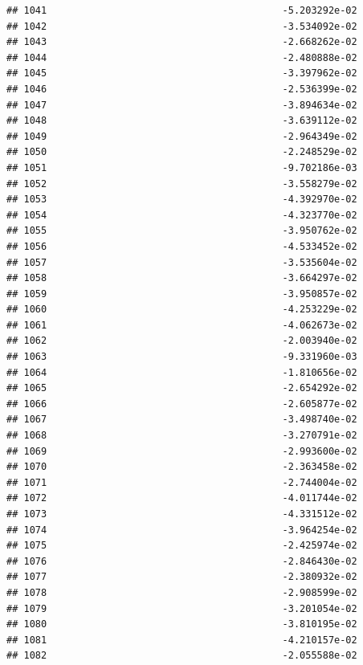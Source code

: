 \documentclass[
]{article}
\begin{document}
\begin{verbatim}
## 1041                                         -5.203292e-02
## 1042                                         -3.534092e-02
## 1043                                         -2.668262e-02
## 1044                                         -2.480888e-02
## 1045                                         -3.397962e-02
## 1046                                         -2.536399e-02
## 1047                                         -3.894634e-02
## 1048                                         -3.639112e-02
## 1049                                         -2.964349e-02
## 1050                                         -2.248529e-02
## 1051                                         -9.702186e-03
## 1052                                         -3.558279e-02
## 1053                                         -4.392970e-02
## 1054                                         -4.323770e-02
## 1055                                         -3.950762e-02
## 1056                                         -4.533452e-02
## 1057                                         -3.535604e-02
## 1058                                         -3.664297e-02
## 1059                                         -3.950857e-02
## 1060                                         -4.253229e-02
## 1061                                         -4.062673e-02
## 1062                                         -2.003940e-02
## 1063                                         -9.331960e-03
## 1064                                         -1.810656e-02
## 1065                                         -2.654292e-02
## 1066                                         -2.605877e-02
## 1067                                         -3.498740e-02
## 1068                                         -3.270791e-02
## 1069                                         -2.993600e-02
## 1070                                         -2.363458e-02
## 1071                                         -2.744004e-02
## 1072                                         -4.011744e-02
## 1073                                         -4.331512e-02
## 1074                                         -3.964254e-02
## 1075                                         -2.425974e-02
## 1076                                         -2.846430e-02
## 1077                                         -2.380932e-02
## 1078                                         -2.908599e-02
## 1079                                         -3.201054e-02
## 1080                                         -3.810195e-02
## 1081                                         -4.210157e-02
## 1082                                         -2.055588e-02

\end{verbatim}
\end{document}
